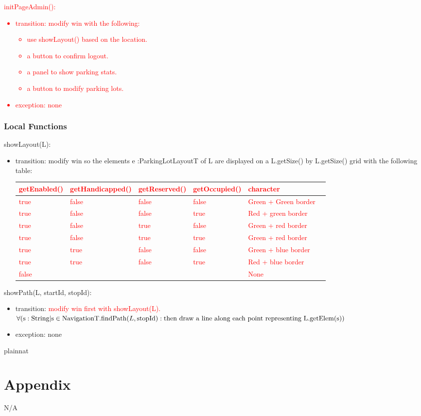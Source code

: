 \documentclass[12pt, titlepage]{article}
\begin{document}
\noindent \textcolor{red}{initPageAdmin():
\begin{itemize} 
\item transition: modify win with the following:
\begin{itemize} 
\item use showLayout() based on the location.
\item a button to confirm logout.
\item a panel to show parking stats.
\item a button to modify parking lots.
\end{itemize}
\item exception: none
\end{itemize}
}

\subsubsection{Local Functions}

\noindent showLayout(L):
\begin{itemize} 
\item transition: modify win so the elements e :ParkingLotLayoutT of L are
displayed on a L.getSize() by L.getSize() grid with the following table: 

\textcolor{red}{
\begin{tabular}{l l l l l l}
\hline
getEnabled() & getHandicapped() & getReserved() & getOccupied() & character \\
\hline
true  & false  & false  & false  & Green + Green border\\
true  & false  & false  & true  & Red + green border\\
true  & false  & true  & false  & Green + red border \\
true  & false  & true  & true  & Green + red border\\
true  & true  & false  & false  & Green + blue border\\
true  & true  & false  & true  & Red + blue border\\
false  & ~  & ~  & ~  & None\\
\hline
\end{tabular}
}
\end{itemize}

\noindent showPath(L, startId, stopId):
\begin{itemize} 
\item transition: \textcolor{red}{modify win first with showLayout(L). \\
$\forall (\text{s} : \text{String} | \text{s} \in
\text{NavigationT}.\text{findPath}(L, \text{stopId}) : \\
\text{then draw a line along each point representing }
\text{L}.\text{getElem}(\text{s}))$} 
\item exception: none
\end{itemize}

\newpage





 {plainnat}


\newpage

\section{Appendix} \label{Appendix} N/A
\end{document}
